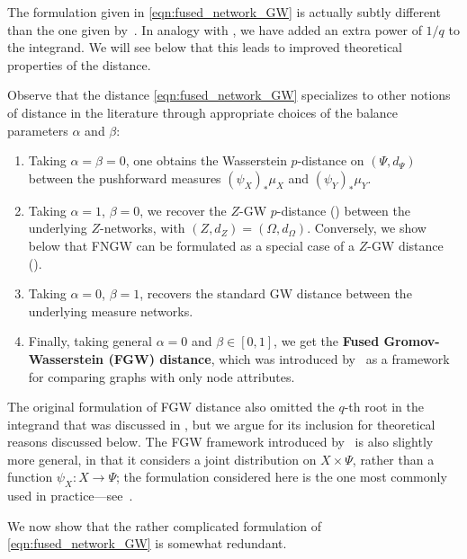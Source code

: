 \documentclass[twoside,11pt]{article}
\theoremstyle{definition}
\newcommand{\define}[1]{\textbf{#1}}
\begin{document}
\begin{remark}\label{rem:qth_root}
    The formulation given in \eqref{eqn:fused_network_GW} is actually subtly different than the one given by~\citet{yang2023exploiting}. In analogy with , we have added an extra power of $1/q$ to the integrand. We will see below that this leads to improved theoretical properties of the distance.
\end{remark}

Observe that the distance \eqref{eqn:fused_network_GW} specializes to other notions of distance in the literature through appropriate choices of the balance parameters $\alpha$ and $\beta$:
\begin{enumerate}
    \item Taking $\alpha = \beta = 0$, one obtains the Wasserstein $p$-distance on $(\Psi,d_\Psi)$ between the pushforward measures $(\psi_X)_\ast \mu_X$ and $(\psi_Y)_\ast \mu_Y$. 
    \item Taking $\alpha = 1$, $\beta = 0$, we recover the $Z$-GW $p$-distance () between the underlying $Z$-networks, with $(Z,d_Z) = (\Omega,d_\Omega)$. Conversely, we show below that FNGW can be formulated as a special case of a $Z$-GW distance ().
    \item Taking $\alpha = 0$, $\beta = 1$, recovers the standard GW distance between the underlying measure networks.
    \item Finally, taking general $\alpha = 0$ and $\beta \in [0,1]$, we get the \define{Fused Gromov-Wasserstein (FGW) distance}, which was introduced by~\citet{vayer2020fused} as a framework for comparing graphs with only node attributes. 
\end{enumerate}

\begin{remark}\label{rem:qth_root_FGW}
    The original formulation of FGW distance also omitted the $q$-th root in the integrand that was discussed in , but we argue for its inclusion for theoretical reasons discussed below. The FGW framework introduced by~\citet{vayer2020fused} is also slightly more general, in that it considers a joint distribution on $X \times \Psi$, rather than a function $\psi_X:X \to \Psi$; the formulation considered here is the one most commonly used in practice---see~\citep{titouan2019optimal,flamary2021pot}.
\end{remark}

We now show that the rather complicated formulation of \eqref{eqn:fused_network_GW} is somewhat redundant.
\end{document}
